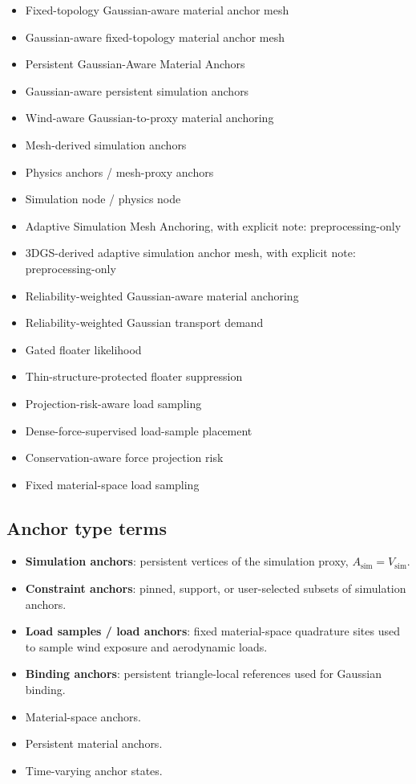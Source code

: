 \documentclass[11pt,a4paper]{article}
\begin{document}
\begin{itemize}[leftmargin=2em]
\item Fixed-topology Gaussian-aware material anchor mesh
\item Gaussian-aware fixed-topology material anchor mesh
\item Persistent Gaussian-Aware Material Anchors
\item Gaussian-aware persistent simulation anchors
\item Wind-aware Gaussian-to-proxy material anchoring
\item Mesh-derived simulation anchors
\item Physics anchors / mesh-proxy anchors
\item Simulation node / physics node
\item Adaptive Simulation Mesh Anchoring, with explicit note: preprocessing-only
\item 3DGS-derived adaptive simulation anchor mesh, with explicit note: preprocessing-only
\item Reliability-weighted Gaussian-aware material anchoring
\item Reliability-weighted Gaussian transport demand
\item Gated floater likelihood
\item Thin-structure-protected floater suppression
\item Projection-risk-aware load sampling
\item Dense-force-supervised load-sample placement
\item Conservation-aware force projection risk
\item Fixed material-space load sampling
\end{itemize}

\subsection{Anchor type terms}

\begin{itemize}[leftmargin=2em]
\item \textbf{Simulation anchors}: persistent vertices of the simulation proxy, $A_{\mathrm{sim}}=V_{\mathrm{sim}}$.
\item \textbf{Constraint anchors}: pinned, support, or user-selected subsets of simulation anchors.
\item \textbf{Load samples / load anchors}: fixed material-space quadrature sites used to sample wind exposure and aerodynamic loads.
\item \textbf{Binding anchors}: persistent triangle-local references used for Gaussian binding.
\item Material-space anchors.
\item Persistent material anchors.
\item Time-varying anchor states.
\end{itemize}
\end{document}
